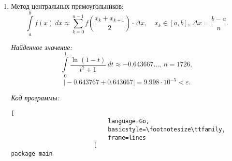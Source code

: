 \documentclass[14pt, a4paper, titlepage, fleqn]{extarticle}
\begin{document}
\begin{enumerate}
                    \pagebreak

                    \textit{Код программы:}
                        \begin{lstlisting}[
                            language=Go,
                            basicstyle=\footnotesize\ttfamily,
                            frame=lines
                        ]
package main

import "math"
import "fmt"

func f(x float64) float64 {
    return ((math.Log(1-x))/(1+x*x))
}

func right_rect(n int, a float64, b float64) float64 {
    s := 0.0
    delta := (b-a)/ float64(n)
    eps := 1e-5
    for i := 1; i <= n; i++ {
        if (i != n) {
            s += f(a + delta * float64(i))
        } else {
            s += f(a + delta * float64(i) - eps)
        }
    }
    s *= delta
    return s
}

func main() {
    n := 0
    eps := 1e-4
    a := 0.0
    b := 1.0
    real := -0.643767
    s := 10000
    n=0
    for math.Abs(real - s) >= eps {
        n++
        s = right_rect(n,a,b)
    }
    fmt.Println(s, n, math.Abs(real-s))
}
                        \end{lstlisting}
                \pagebreak
                
                \item Метод центральных прямоугольников:
                    \[
                        \int\limits_a^b f(x) ~ dx \approx
                        \sum_{k=0}^{n-1} f\left( \frac{x_k + x_{k+1}}{2}\right)\cdot
                        \Delta x,
                        \quad x_k \in [a, b], ~ \Delta x = \frac{b-a}{n}.
                    \]

                    \textit{Найденное значение:}
                        \[
                            \int\limits_0^1 \frac{\ln(1-t)}{t^2+1} ~ dt \approx
                            -0.643667\dots, ~ n = 1726,
                        \]
                        \[
                            \vert-0.643767+0.643667\vert = 9.998 
                            \cdot 10^{-5} < \varepsilon.
                        \]

                    \pagebreak

                    \textit{Код программы:}
                        \begin{lstlisting}[
                            language=Go,
                            basicstyle=\footnotesize\ttfamily,
                            frame=lines
                        ]
package main


\end{lstlisting}
\end{enumerate}
\end{document}
